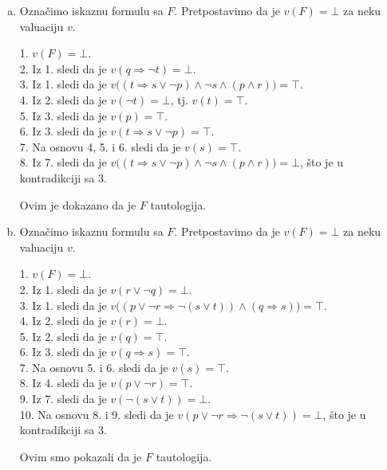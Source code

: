 \begin{enumerate}[(a)]
Dakle, $F$ je tautologija.

%
%

\item Ozna\v cimo iskaznu formulu sa $F$. Pretpostavimo da je $v(F)=\bot$ za neku valuaciju $v$.

1. $v(F)=\bot$.\\
2. Iz 1. sledi da je $v(q\Rightarrow \neg t)=\bot$.\\
3. Iz 1. sledi da je $v\big((t\Rightarrow s\vee \neg p)\wedge \neg s\wedge (p\wedge r)\big)=\top$.\\
4. Iz 2. sledi da je $v(\neg t)=\bot$, tj. $v(t)=\top$.\\
5. Iz 3. sledi da je $v(p)=\top$.\\
6. Iz 3. sledi da je $v(t\Rightarrow s\vee\neg p)=\top$.\\
7. Na osnovu 4, 5. i 6. sledi da je $v(s)=\top$.\\
8. Iz 7. sledi da je $v\big((t\Rightarrow s\vee \neg p)\wedge \neg s\wedge (p\wedge r)\big)=\bot$, \v sto je u kontradikciji sa 3.

Ovim je dokazano da je $F$ tautologija.

\item Ozna\v cimo iskaznu formulu sa $F$. Pretpostavimo da je $v(F)=\bot$ za neku valuaciju $v$.

1. $v(F)=\bot$.\\
2. Iz 1. sledi da je $v(r\vee\neg q)=\bot$.\\
3. Iz 1. sledi da je $v\big((p\vee\neg r\Rightarrow \neg(s\vee t))\wedge(q\Rightarrow s)\big)=\top$.\\
4. Iz 2. sledi da je $v(r)=\bot$.\\
5. Iz 2. sledi da je $v(q)=\top$.\\
6. Iz 3. sledi da je $v(q\Rightarrow s)=\top$.\\
7. Na osnovu 5. i 6. sledi da je $v(s)=\top$.\\
8. Iz 4. sledi da je $v(p\vee\neg r)=\top$.\\
9. Iz 7. sledi da je $v(\neg(s\vee t))=\bot$.\\
10. Na osnovu 8. i 9. sledi da je $v(p\vee\neg r\Rightarrow \neg(s\vee t))=\bot$, \v sto je u kontradikciji sa 3.

Ovim smo pokazali da je $F$ tautologija.
\end{enumerate}

